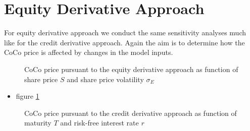 \section{Equity Derivative Approach}\label{sensiequity}

For equity derivative approach we conduct the same sensitivity analyses much like for the credit derivative approach. Again the aim is to determine how the CoCo price is affected by changes in the model inputs. 

\begin{figure}[H]
\centering
    \caption[CoCo price pursuant to the equity derivative approach as function of share price and share price volatility]{CoCo price pursuant to the equity derivative approach as function of share price $S$ and share price volatility $\sigma_E$}
  \label{fig:ed1}
  \end{figure}
  
  \begin{itemize}
  \item figure \ref{fig:ed1}
  \end{itemize}
 
\begin{figure}[H]
\centering
{}
    \caption[CoCo price pursuant to the equity derivative approach as function of maturity and interest rate]{CoCo price pursuant to the credit derivative approach as function of maturity $T$ and risk-free interest rate $r$}
  \label{fig:ed2}
  \end{figure}
  
